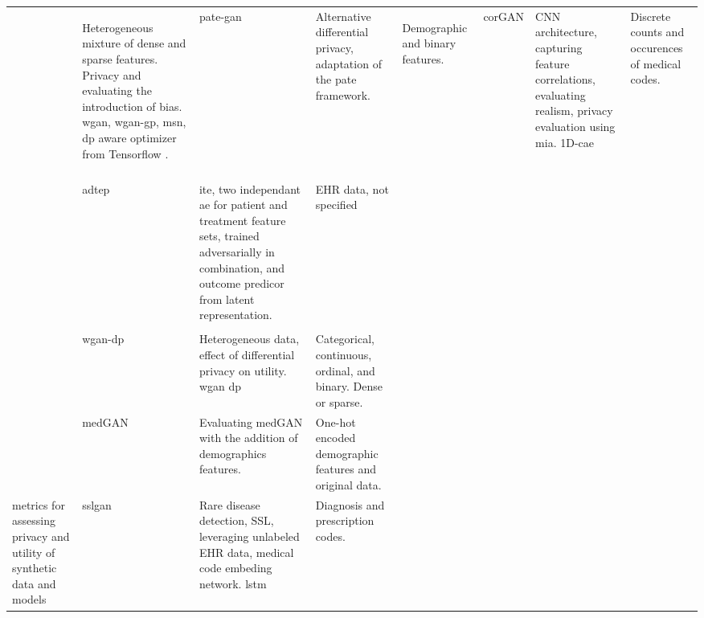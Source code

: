 \begin{sidewaystable}[htbp]
\begin{tabularx}{\textwidth}{@{}p{4cm}XXX@{}}
            \cite{chin2019generation}
            & Heterogeneous mixture of dense and sparse features. Privacy and evaluating the introduction of bias. \gls{wgan}, \gls{wgan-gp}, 					\gls{msn}, \gls{dp} aware optimizer from Tensorflow \cite{tensorflow-privacy}.
            
            \cite{Jordon2019}
            & \gls{pate-gan}
            & Alternative differential privacy, adaptation of the  \gls{pate} framework.
            & Demographic and binary features.
            
            \cite{torfi2019generating}
            & \gls{corGAN}
            & \gls{CNN} architecture, capturing feature correlations, evaluating realism, privacy evaluation using \gls{mia}. 1D-\gls{cae}
            & Discrete counts and occurences of medical codes.\\
            
            \cite{Yale_2020}
            & 
            & 
            &\\
            
            \cite{chu2019treatment}
            & \gls{adtep}
            & \gls{ite}, two independant \gls{ae} for patient and treatment feature sets, trained adversarially in combination, and outcome predicor 			from latent representation. 
            & EHR data, not specified\\
            
            \cite{severo2019ward2icu}
            & 
            & 
            &\\
            
            
            \cite{chincheong2020generation}
            &  \gls{wgan-dp}
            & Heterogeneous data, effect of differential privacy on utility. \gls{wgan} \gls{dp}
            & Categorical, continuous,  ordinal, and binary. Dense or sparse.\\
            
            
            \cite{Jackson_2019}
            & \gls{medGAN}
            & Evaluating medGAN with the addition of demographics features.
            & One-hot encoded demographic features and original data. \\
            
            metrics for assessing privacy and utility of synthetic data and models
            \cite{yu2019rare}
            & \gls{sslgan}
            & Rare disease detection, \gls{SSL}, leveraging unlabeled \gls{EHR} data, medical code embeding network. \gls{lstm}
            & Diagnosis and prescription codes.\\
            

\end{tabularx}
\end{sidewaystable}
